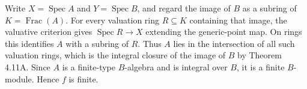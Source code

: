 Write $X=\operatorname{Spec}A$ and $Y=\operatorname{Spec}B$, and regard the image of $B$ as a subring of $K=\operatorname{Frac}(A)$. For every valuation ring $R\subseteq K$ containing that image, the valuative criterion gives $\operatorname{Spec}R\to X$ extending the generic-point map. On rings this identifies $A$ with a subring of $R$. Thus $A$ lies in the intersection of all such valuation rings, which is the integral closure of the image of $B$ by Theorem 4.11A. Since $A$ is a finite-type $B$-algebra and is integral over $B$, it is a finite $B$-module. Hence $f$ is finite.
